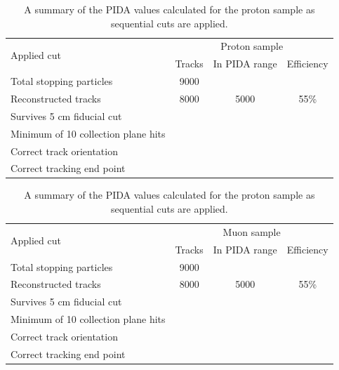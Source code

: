 \begin{table}
  \caption[A summary of the PIDA values calculated for the proton sample as sequential cuts are applied]
          {A summary of the PIDA values calculated for the proton sample as sequential cuts are applied.}
  \centering
  \label{tab:Isol_PIDA_Proton}
  \begin{tabular}{l c c c}
    \toprule
    \multirow{2}{*}{Applied cut} & \multicolumn{3}{c}{Proton sample} \\ 
    \cmidrule{2-4}
      & Tracks & In PIDA range & Efficiency \\ 
    \midrule
      Total stopping particles            & 9000 &      &      \\

      Reconstructed tracks                & 8000 & 5000 & 55\% \\

      Survives 5 cm fiducial cut          &      &      &      \\

      Minimum of 10 collection plane hits &      &      &      \\

      Correct track orientation           &      &      &      \\

      Correct tracking end point          &      &      &      \\
    \bottomrule
  \end{tabular}
\end{table}

\begin{table}
  \caption[A summary of the PIDA values calculated for the proton sample as sequential cuts are applied]
          {A summary of the PIDA values calculated for the proton sample as sequential cuts are applied.}
  \centering
  \label{tab:Isol_PIDA_Muon}
  \begin{tabular}{l c c c}
    \toprule
    \multirow{2}{*}{Applied cut} & \multicolumn{3}{c}{Muon sample} \\ 
    \cmidrule{2-4}
      & Tracks & In PIDA range & Efficiency \\ 
    \midrule
      Total stopping particles            & 9000 &      &      \\

      Reconstructed tracks                & 8000 & 5000 & 55\% \\

      Survives 5 cm fiducial cut          &      &      &      \\

      Minimum of 10 collection plane hits &      &      &      \\

      Correct track orientation           &      &      &      \\

      Correct tracking end point          &      &      &      \\
    \bottomrule
  \end{tabular}
\end{table}

